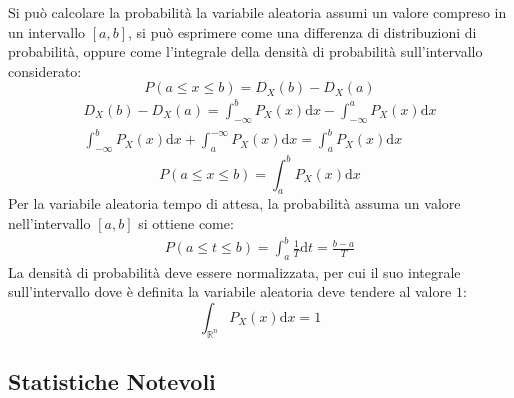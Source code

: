 \documentclass{article}
\newcommand{\df}{\mathrm{d}}
\numberwithin{equation}{subsection}
\begin{document}
Si può calcolare la probabilità la variabile aleatoria assumi un valore compreso in un intervallo $[a,b]$, si può esprimere come una differenza di distribuzioni di 
probabilità, oppure come l'integrale della densità di probabilità sull'intervallo considerato:
\begin{equation}
    P(a\leq x\leq b)=D_X(b)-D_X(a)
\end{equation}
\begin{gather*}
    D_X(b)-D_X(a)=\displaystyle\int_{-\infty}^bP_X(x)\df x-\int_{-\infty}^aP_X(x)\df x\\
    \int_{-\infty}^bP_X(x)\df x+\int^{-\infty}_aP_X(x)\df x=\int_a^bP_X(x)\df x
\end{gather*}
\begin{equation}
    P(a\leq x\leq b)=\displaystyle\int_a^bP_X(x)\df x
\end{equation}
Per la variabile aleatoria tempo di attesa, la probabilità assuma un valore nell'intervallo $[a,b]$ si ottiene come:
\begin{gather*}
    P(a\leq t\leq b)=\displaystyle\int_a^b\frac{1}{T}\df t=\frac{b-a}{T}
\end{gather*}
La densità di probabilità deve essere normalizzata, per cui il suo integrale sull'intervallo dove è definita la variabile aleatoria deve tendere al valore $1$:
\begin{equation}
    \displaystyle\int_{\mathbb{R}^n}P_X(x)\df x=1
\end{equation}

\subsection{Statistiche Notevoli}
\end{document}
